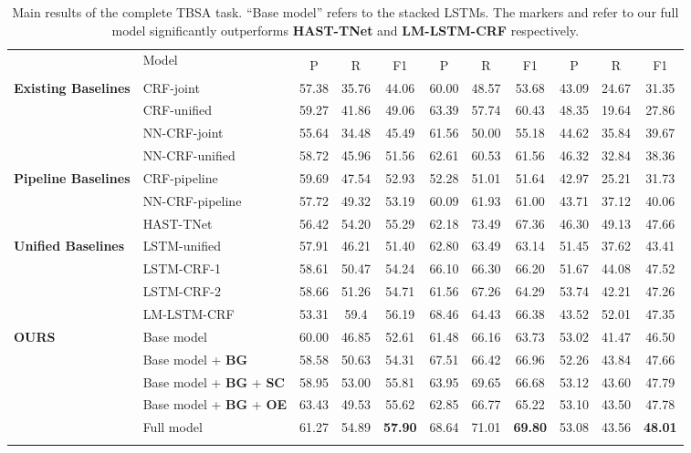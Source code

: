 \documentclass[letterpaper]{article} \usepackage{aaai19}  \usepackage{times}  \usepackage{helvet}  \usepackage{courier}  \usepackage{url}  \usepackage{graphicx}  \frenchspacing  \setlength{\pdfpagewidth}{8.5in}  \setlength{\pdfpageheight}{11in}
\begin{document}
\begin{table*}[]
    \centering
    \begin{tabular}{ll|ccc|ccc|ccc}
    \Xhline{3\arrayrulewidth}
        & \multirow{2}{*}{Model} & \multicolumn{3}{c|}{} & \multicolumn{3}{c|}{} & \multicolumn{3}{c}{}\\ \cline{3-11} 
        & & P & R & F1 & P & R & F1 & P & R & F1 \\ \hline \hline
        \multirow{4}{*}{\textbf{Existing Baselines}} & CRF-joint & 57.38 & 35.76 & 44.06 & 60.00 & 48.57 & 53.68 & 43.09 & 24.67 & 31.35 \\
        & CRF-unified & 59.27 & 41.86 & 49.06 & 63.39 & 57.74 & 60.43 & 48.35 & 19.64 & 27.86 \\ 
        & NN-CRF-joint & 55.64 & 34.48 & 45.49 & 61.56 & 50.00 & 55.18 & 44.62 & 35.84 & 39.67 \\
        & NN-CRF-unified & 58.72 & 45.96 & 51.56 & 62.61 & 60.53 & 61.56 & 46.32 & 32.84 & 38.36 \\ \hline
\multirow{3}{*}{\textbf{Pipeline Baselines}} & CRF-pipeline & 59.69 & 47.54 & 52.93 & 52.28 & 51.01 & 51.64 & 42.97 & 25.21 & 31.73 \\
        & NN-CRF-pipeline & 57.72 & 49.32 & 53.19 & 60.09 & 61.93 & 61.00 & 43.71 & 37.12 & 40.06 \\
        & HAST-TNet & 56.42 & 54.20 & 55.29 & 62.18 & 73.49 & 67.36 & 46.30 & 49.13 & 47.66 \\ \hline
        \multirow{4}{*}{\textbf{Unified Baselines}} & LSTM-unified & 57.91 & 46.21 & 51.40 & 62.80 & 63.49 & 63.14 & 51.45 & 37.62 & 43.41 \\
        &LSTM-CRF-1 & 58.61 & 50.47 & 54.24 & 66.10 & 66.30 & 66.20 & 51.67 & 44.08 & 47.52 \\
        & LSTM-CRF-2 & 58.66 & 51.26 & 54.71 & 61.56 & 67.26 & 64.29 & 53.74 & 42.21 & 47.26 \\
        & LM-LSTM-CRF & 53.31 & 59.4 & 56.19 & 68.46 & 64.43 & 66.38 & 43.52 & 52.01 & 47.35 \\ \hline
        \multirow{5}{*}{\textbf{OURS}}  
        & Base model & 60.00 & 46.85 & 52.61 & 61.48 & 66.16 & 63.73 & 53.02 & 41.47 & 46.50 \\
        & Base model + \textbf{BG} & 58.58 & 50.63 & 54.31 & 67.51 & 66.42 & 66.96 & 52.26 & 43.84 & 47.66 \\
        & Base model + \textbf{BG} + \textbf{SC} & 58.95 & 53.00 & 55.81 & 63.95 & 69.65 & 66.68 & 53.12 & 43.60 & 47.79 \\
        & Base model + \textbf{BG} + \textbf{OE} & 63.43 & 49.53 & 55.62 & 62.85 & 66.77 & 65.22 & 53.10 & 43.50 & 47.78 \\
        & Full model & 61.27 & 54.89 & \textbf{57.90} & 68.64 & 71.01 & \textbf{69.80} & 53.08 & 43.56 & \textbf{48.01} \\
        \Xhline{3\arrayrulewidth}
    \end{tabular}
    \caption{Main results of the complete TBSA task. ``Base model'' refers to the stacked LSTMs. The markers  and  refer to our full model significantly outperforms \textbf{HAST-TNet} and \textbf{LM-LSTM-CRF} respectively.}
    \label{tab:main_results}
\end{table*}
\end{document}
